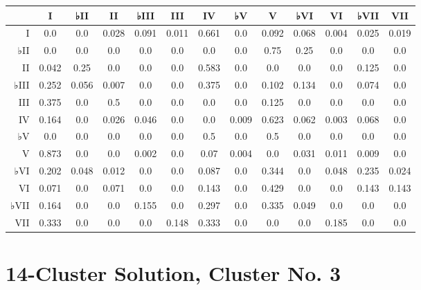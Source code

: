 \begin{table}[htbp]
\begin{minipage}{\linewidth}
\setlength{\tymax}{0.5\linewidth}
\centering
\small
\begin{tabulary}{\textwidth}{@{}RCCCCCCCCCCCC@{}} \toprule
&I&♭II&II&♭III&III&IV&♭V&V&♭VI&VI&♭VII&VII\\
\midrule
I&0.0&0.0&0.028&0.091&0.011&0.661&0.0&0.092&0.068&0.004&0.025&0.019\\
♭II&0.0&0.0&0.0&0.0&0.0&0.0&0.0&0.75&0.25&0.0&0.0&0.0\\
II&0.042&0.25&0.0&0.0&0.0&0.583&0.0&0.0&0.0&0.0&0.125&0.0\\
♭III&0.252&0.056&0.007&0.0&0.0&0.375&0.0&0.102&0.134&0.0&0.074&0.0\\
III&0.375&0.0&0.5&0.0&0.0&0.0&0.0&0.125&0.0&0.0&0.0&0.0\\
IV&0.164&0.0&0.026&0.046&0.0&0.0&0.009&0.623&0.062&0.003&0.068&0.0\\
♭V&0.0&0.0&0.0&0.0&0.0&0.5&0.0&0.5&0.0&0.0&0.0&0.0\\
V&0.873&0.0&0.0&0.002&0.0&0.07&0.004&0.0&0.031&0.011&0.009&0.0\\
♭VI&0.202&0.048&0.012&0.0&0.0&0.087&0.0&0.344&0.0&0.048&0.235&0.024\\
VI&0.071&0.0&0.071&0.0&0.0&0.143&0.0&0.429&0.0&0.0&0.143&0.143\\
♭VII&0.164&0.0&0.0&0.155&0.0&0.297&0.0&0.335&0.049&0.0&0.0&0.0\\
VII&0.333&0.0&0.0&0.0&0.148&0.333&0.0&0.0&0.0&0.185&0.0&0.0\\

\bottomrule

\end{tabulary}
\end{minipage}
\end{table}

\section{14-Cluster Solution, Cluster No. 3}
\label{14-clustersolutionclusterno.3}

